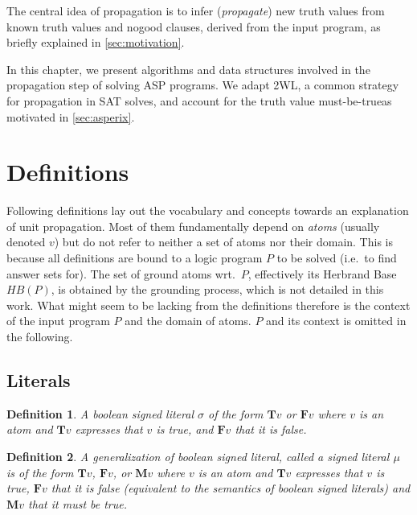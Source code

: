 \documentclass{vutinfth} %
\newtheorem{definition}{Definition}[section]
\newcommand{\mbt}{must-be-true}
\newcommand{\bT}{\mathbf{T}}
\newcommand{\bM}{\mathbf{M}}
\newcommand{\bF}{\mathbf{F}}
\newcommand{\sgl}{\mu}
\newcommand{\bsgl}{\sigma}
\begin{document}
The central idea of propagation is to infer (\emph{propagate}) new truth values from known truth values and nogood clauses, derived from the input program, as briefly explained in \ref{sec:motivation}. 

In this chapter, we present algorithms and data structures involved in the propagation step of solving ASP programs. We adapt 2WL, a common strategy for propagation in SAT solves, and account for the truth value \mbt as motivated in \ref{sec:asperix}.

\section{Definitions}


Following definitions lay out the vocabulary and concepts towards an explanation of unit propagation. Most of them fundamentally depend on \emph{atoms} (usually denoted $v$) but do not refer to neither a set of atoms nor their domain. This is because all definitions are bound to a logic program $P$ to be solved (i.e.~to find answer sets for). The set of ground atoms wrt.~$P$, effectively its Herbrand Base $\textit{HB}(P)$, is obtained by the grounding process, which is not detailed in this work. What might seem to be lacking from the definitions therefore is the context of the input program $P$ and the domain of atoms. $P$ and its context is omitted in the following.

\subsection{Literals}


\begin{definition}
A \emph{boolean signed literal} $\bsgl$ of the form $\bT v$ or $\bF v$ where $v$ is an atom and  $\bT v$ expresses that $v$ is \emph{true}, and $\bF v$ that it is \emph{false}.
\end{definition}

\begin{definition}
A generalization of boolean signed literal, called a \emph{signed literal} $\sgl$ is of the form $\bT v$, $\bF v$, or $\bM v$ where $v$ is an atom and $\bT v$ expresses that $v$ is \emph{true}, $\bF v$ that it is \emph{false} (equivalent to the semantics of boolean signed literals) and $\bM v$ that it \emph{must be true}.
\end{definition}
\end{document}
